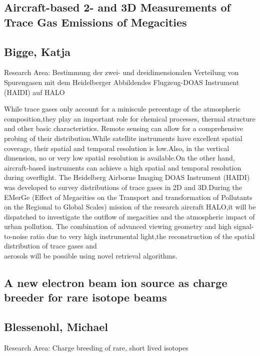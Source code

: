 \subsection*{\centering \large Aircraft-based 2- and 3D Measurements of Trace Gas Emissions of Megacities}
\subsection*{\centering \normalsize Bigge, Katja}
Research Area: Bestimmung der zwei- und dreidimensionalen Verteilung von Spurengasen mit dem Heidelberger Abbildendes Flugzeug-DOAS Instrument (HAIDI) auf HALO\newline

\noindent While trace gases only account for a miniscule percentage of the atmospheric composition,they play an important role for chemical processes, thermal structure and other basic characteristics. Remote sensing can allow for a comprehensive probing of their distribution.While satellite instruments have excellent spatial coverage, their spatial and temporal resolution is low.Also, in the vertical dimension, no or very low spatial resolution is available.On the other hand, aircraft-based instruments can achieve a high spatial and temporal resolution during overflight. The Heidelberg Airborne Imaging DOAS Instrument (HAIDI) was developed to survey distributions of trace gases in 2D and 3D.During the EMerGe (Effect of Megacities on the Transport and transformation of Pollutants on the Regional to Global Scales) mission of the research aircraft HALO,it will be dispatched to investigate the outflow of megacities and the atmospheric impact of urban pollution. The combination of advanced viewing geometry and high signal-to-noise ratio due to very high instrumental light,the reconstruction of the spatial distribution of trace gases and\\aerosols will be possible using novel retrieval algorithms.

\subsection*{\centering \large A new electron beam ion source as charge breeder for rare isotope beams}
\subsection*{\centering \normalsize Blessenohl, Michael}
Research Area: Charge breeding of rare, short lived isotopes\newline

